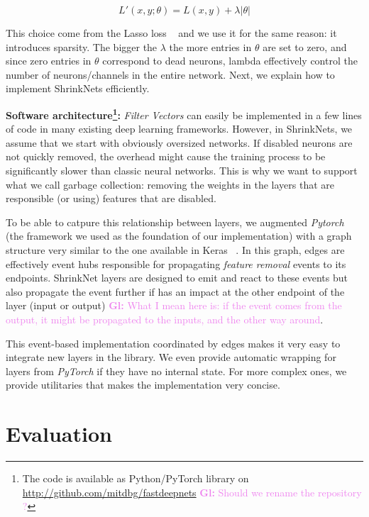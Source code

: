 \documentclass[sigconf]{acmart}
\newcommand{\gl}[1]{\textcolor{violet}{{\bf Gl:} #1}}
\begin{document}
\begin{equation}
  L'(x,y;\theta) = L(x, y) + \lambda|\theta|
\end{equation}

This choice come from the Lasso loss ~\cite{Tibshirani1996} and we use it for the same reason:
it introduces sparsity. The bigger the $\lambda$ the more entries in $\theta$
are set to zero, and since zero entries in $\theta$ correspond to dead neurons,
lambda effectively control the number of neurons/channels in the entire
network.
Next, we explain how to implement ShrinkNets efficiently.

\textbf{Software architecture\footnote{The code is available as Python/PyTorch
    library on \url{http://github.com/mitdbg/fastdeepnets} \gl{Should we rename
      the repository ?}}: }\textit{Filter Vectors} can easily be implemented in
a few lines of code in many existing deep learning frameworks. However, in
ShrinkNets, we assume that we start with obviously oversized networks. If
disabled neurons are not quickly removed, the overhead might cause the training
process to be significantly slower than classic neural networks. This is why we
want to support what we call garbage collection: removing the weights in the
layers that are responsible (or using) features that are disabled.  \par To be
able to catpure this relationship between layers, we augmented \textit{Pytorch}
~\cite{paszke2017automatic} (the framework we used as the
foundation of our implementation) with a graph structure very similar to the
one available in Keras ~\cite{chollet2015keras}.  In this graph, edges are
effectively event hubs responsible for propagating \textit{feature removal}
events to its endpoints. ShrinkNet layers are designed to emit and react to
these events but also propagate the event further if has an impact at the other
endpoint of the layer (input or output) \gl{What I mean here is: if the event
  comes from the output, it might be propagated to the inputs, and the other
  way around}.  \par This event-based implementation coordinated by edges makes
it very easy to integrate new layers in the library.  We even provide automatic
wrapping for layers from \textit{PyTorch} if they have no internal state. For
more complex ones, we provide utilitaries that
makes the implementation very concise.

\section{Evaluation}
\end{document}

